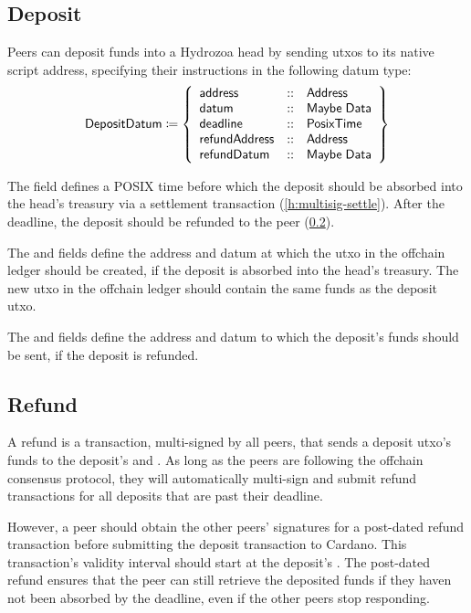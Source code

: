 \documentclass[../hydrozoa.tex]{subfiles}
\begin{document}
\subsection{Deposit}%
\label{h:multisig-deposit}
Peers can deposit funds into a Hydrozoa head by sending utxos to its native script address, specifying their instructions in the following datum type:
\begin{equation*}
  \mathsf{DepositDatum} \coloneq \left\{
  \begin{array}{lll}
    \mathsf{address} &::& \mathsf{Address} \\
    \mathsf{datum} &::& \mathsf{Maybe \; Data} \\
    \mathsf{deadline} &::& \mathsf{PosixTime} \\
    \mathsf{refundAddress} &::& \mathsf{Address} \\
    \mathsf{refundDatum} &::& \mathsf{Maybe \; Data}
  \end{array}\right\}
\end{equation*}

The  field defines a POSIX time before which the deposit should be absorbed into the head's treasury via a settlement transaction (\cref{h:multisig-settle}).
After the deadline, the deposit should be refunded to the peer (\cref{h:multisig-refund}).

The  and  fields define the address and datum at which the utxo in the offchain ledger should be created, if the deposit is absorbed into the head's treasury.
The new utxo in the offchain ledger should contain the same funds as the deposit utxo.

The  and  fields define the address and datum to which the deposit's funds should be sent, if the deposit is refunded.

\subsection{Refund}%
\label{h:multisig-refund}
A refund is a transaction, multi-signed by all peers, that sends a deposit utxo's funds to the deposit's  and .
As long as the peers are following the offchain consensus protocol, they will automatically multi-sign and submit refund transactions for all deposits that are past their deadline.

However, a peer should obtain the other peers' signatures for a post-dated refund transaction before submitting the deposit transaction to Cardano.
This transaction's validity interval should start at the deposit's .
The post-dated refund ensures that the peer can still retrieve the deposited funds if they haven not been absorbed by the deadline, even if the other peers stop responding.
\end{document}
